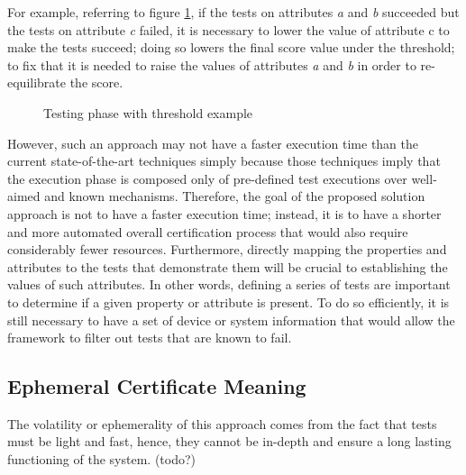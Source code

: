 For example, referring to figure \ref{fig:thex}, if the tests on attributes \textit{a} and \textit{b} succeeded but the tests on attribute \textit{c} failed, it is necessary to lower the value of attribute c to make the tests succeed; doing so lowers the final score value under the threshold; to fix that it is needed to raise the values of attributes \textit{a} and \textit{b} in order to re-equilibrate the score.

\begin{figure}[htb]
    \centering
    \caption{Testing phase with threshold example}
    \label{fig:thex}
\end{figure}

However, such an approach may not have a faster execution time than the current state-of-the-art techniques simply because those techniques imply that the execution phase is composed only of pre-defined test executions over well-aimed and known mechanisms. Therefore, the goal of the proposed solution approach is not to have a faster execution time; instead, it is to have a shorter and more automated overall certification process that would also require considerably fewer resources. Furthermore, directly mapping the properties and attributes to the tests that demonstrate them will be crucial to establishing the values of such attributes. In other words, defining a series of tests are important to determine if a given property or attribute is present. To do so efficiently, it is still necessary to have a set of device or system information that would allow the framework to filter out tests that are known to fail.



\subsection{Ephemeral Certificate Meaning}
The volatility or ephemerality of this approach comes from the fact that tests must be light and fast, hence, they cannot be in-depth and ensure a long lasting functioning of the system. (todo?)
